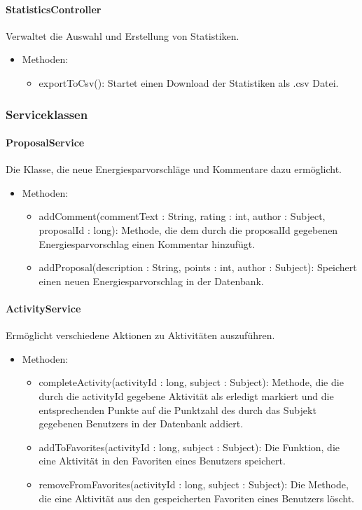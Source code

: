 	\paragraph{StatisticsController}Verwaltet die Auswahl und Erstellung von Statistiken.
		\begin{itemize}
			\item Methoden:
			\begin{itemize}
				\item exportToCsv(): Startet einen Download der Statistiken als .csv Datei.
			\end{itemize}
		\end{itemize}

\subsubsection{Serviceklassen}
	\paragraph{ProposalService}Die Klasse, die neue Energiesparvorschl\"age und Kommentare dazu erm\"oglicht.
		\begin{itemize}
			\item Methoden:
			\begin{itemize}
				\item addComment(commentText : String, rating : int, author : Subject, proposalId : long): Methode, die dem durch die proposalId gegebenen Energiesparvorschlag einen Kommentar hinzuf\"ugt.
				\item addProposal(description : String, points : int, author : Subject): Speichert einen neuen Energiesparvorschlag in der Datenbank.
			\end{itemize}
		\end{itemize}
	\paragraph{ActivityService}Erm\"oglicht verschiedene Aktionen zu Aktivit\"aten auszuf\"uhren.
		\begin{itemize}
			\item Methoden:
			\begin{itemize}
				\item completeActivity(activityId : long, subject : Subject): Methode, die die durch die activityId gegebene Aktivit\"at als erledigt markiert und die entsprechenden Punkte auf die Punktzahl des durch das Subjekt gegebenen Benutzers in der Datenbank addiert.
				\item addToFavorites(activityId : long, subject : Subject): Die Funktion, die eine Aktivit\"at in den Favoriten eines Benutzers speichert.
				\item removeFromFavorites(activityId : long, subject : Subject): Die Methode, die eine Aktivit\"at aus den gespeicherten Favoriten eines Benutzers l\"oscht.
			\end{itemize}
		\end{itemize}

